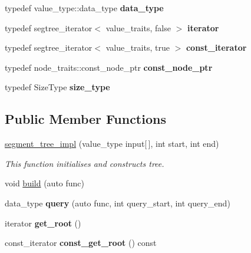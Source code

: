\begin{DoxyCompactItemize}
typedef value\+\_\+type\+::data\+\_\+type {\bfseries data\+\_\+type}
\item 
\mbox{\label{classboost_1_1intrusive_1_1segment__tree__impl_a9f1be9b01be5078fb59b2e34520b374a}} 
typedef segtree\+\_\+iterator$<$ value\+\_\+traits, false $>$ {\bfseries iterator}
\item 
\mbox{\label{classboost_1_1intrusive_1_1segment__tree__impl_a6957e501101f1d5427f611f6ee8d1ded}} 
typedef segtree\+\_\+iterator$<$ value\+\_\+traits, true $>$ {\bfseries const\+\_\+iterator}
\item 
\mbox{\label{classboost_1_1intrusive_1_1segment__tree__impl_aa0f2dc05aa707192c6daa27f509642ed}} 
typedef node\+\_\+traits\+::const\+\_\+node\+\_\+ptr {\bfseries const\+\_\+node\+\_\+ptr}
\item 
\mbox{\label{classboost_1_1intrusive_1_1segment__tree__impl_ad11efa20e1eb479bc39e13ea312ca088}} 
typedef Size\+Type {\bfseries size\+\_\+type}
\end{DoxyCompactItemize}
\subsection*{Public Member Functions}
\begin{DoxyCompactItemize}
\item 
\hyperlink{classboost_1_1intrusive_1_1segment__tree__impl_abda73e6d62b92e32db5df65cb425ac59}{segment\+\_\+tree\+\_\+impl} (value\+\_\+type input\mbox{[}$\,$\mbox{]}, int start, int end)
\begin{DoxyCompactList}\small\item\em This function initialises and constructs tree. \end{DoxyCompactList}\item 
void \hyperlink{classboost_1_1intrusive_1_1segment__tree__impl_a1b2e8afd13fc6e33640665efa2677dba}{build} (auto func)
\item 
\mbox{\label{classboost_1_1intrusive_1_1segment__tree__impl_ad0aa848ccb9520e36cf4dfbf9149b150}} 
data\+\_\+type {\bfseries query} (auto func, int query\+\_\+start, int query\+\_\+end)
\item 
\mbox{\label{classboost_1_1intrusive_1_1segment__tree__impl_a684131001e17323dfbf6b1781c632471}} 
iterator {\bfseries get\+\_\+root} ()
\item 
\mbox{\label{classboost_1_1intrusive_1_1segment__tree__impl_a562cca39fe52f31330ff71f32d58fb72}} 
const\+\_\+iterator {\bfseries const\+\_\+get\+\_\+root} () const
\end{DoxyCompactItemize}
